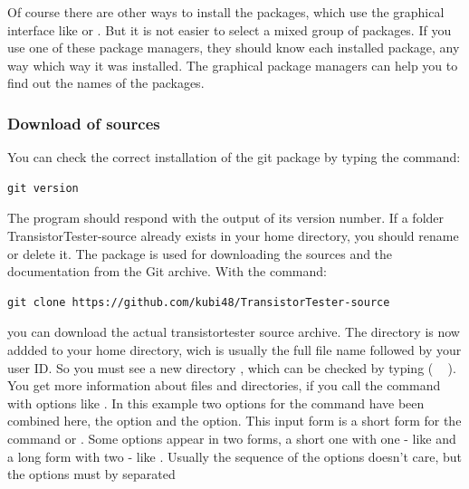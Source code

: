 Of course there are other ways to install the packages, which use the graphical interface
like  or . But it is not easier to select a mixed group of packages.
If you use one of these package managers, they should know each installed package,
any way which way it was installed.
The graphical package managers can help you to find out the names of the packages.


\subsubsection{Download of sources}

You can check the correct installation of the git package by typing the command:
\begin{large} \vspace{-0.4em} \begin{verbatim}
git version
\end{verbatim} \end{large}
The  program should respond with the output of its version number.
If a folder TransistorTester-source already exists in your home directory,
you should rename or delete it.
The package  is used for downloading the sources and the documentation from the Git archive.
With the command:
\begin{large} \vspace{-0.4em} \begin{verbatim}
git clone https://github.com/kubi48/TransistorTester-source
\end{verbatim} \end{large}
you can download the actual transistortester source archive.
The directory  is now addded to your home directory,
wich is usually the full file name  followed by your user ID.
So you must see a new directory , which can
be checked by typing  ( \mbox{  \keys{\return}} ).
You get more information about files and directories, if you call
the command with options like .
In this example two options for the  command have been combined here,
the  option and the  option.
This input form is a short form for the command  or
.
Some options appear in two forms, a short one with one - like  and a long form
with two -  like .
Usually the sequence of the options doesn't care, but the options must by separated
